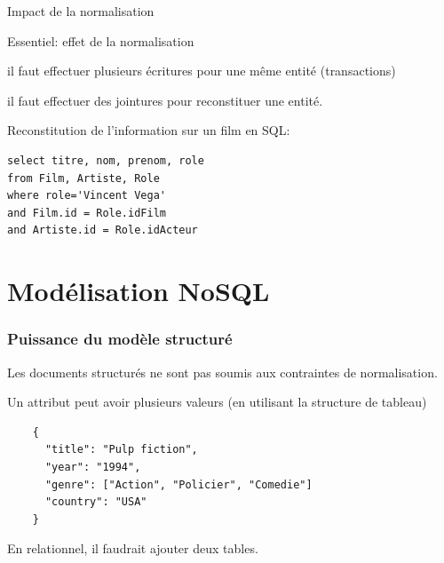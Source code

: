 \begin{frame}[fragile]{Impact de la normalisation}

\begin{remblock}{Essentiel: effet de la normalisation}
\begin{redbullet}
  \item il faut effectuer \alert{plusieurs écritures} pour une même entité (transactions)
  \item il faut effectuer des \alert{jointures} pour reconstituer une entité.
\end{redbullet}
\end{remblock}

\vfill

Reconstitution de l'information sur un film en SQL:

\begin{verbatim}
select titre, nom, prenom, role
from Film, Artiste, Role
where role='Vincent Vega'
and Film.id = Role.idFilm
and Artiste.id = Role.idActeur
\end{verbatim}

\end{frame}


\section{Modélisation NoSQL}


\begin{frame}[fragile]
\frametitle{Puissance du modèle structuré}

Les documents structurés ne sont pas soumis aux contraintes de normalisation.


\vfill

Un attribut peut avoir \alert{plusieurs valeurs} (en utilisant la structure de tableau)
\begin{verbatim}
    {
      "title": "Pulp fiction",
      "year": "1994",
      "genre": ["Action", "Policier", "Comedie"]
      "country": "USA"
    }
\end{verbatim}


\vfill

En relationnel, il faudrait ajouter deux tables.


\end{frame}

